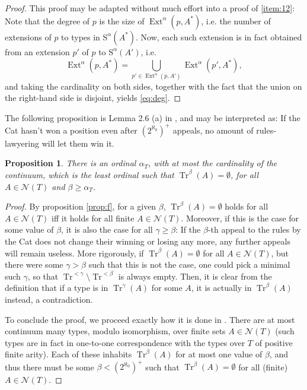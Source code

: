 \documentclass{article}
\newtheorem{prop}[theorem]{Proposition}
\theoremstyle{nonumberplain}
\newtheorem{proof}{Proof}
\newcommand{\calN}{\mathcal{N}}
\newcommand{\Stone}{\mathrm{S}}
\DeclareMathOperator{\Tr}{Tr}
\DeclareMathOperator{\Ext}{Ext}
\begin{document}
\begin{proof}
This proof may be adapted without much effort into a proof of \ref{item:12}: Note that the degree of $p$ is the size of $\Ext^\alpha(p,A^*)$, i.e. the number of extensions of $p$ to types in $\Stone^\alpha(A^*)$. Now, each such extension is in fact obtained from an extension $p'$ of $p$ to $\Stone^\alpha(A')$, i.e.
\begin{equation}
\Ext^\alpha(p,A^*) = \bigcup_{p' \in \Ext^\alpha(p,A')} \Ext^\alpha(p',A^*),
\end{equation}
and taking the cardinality on both sides, together with the fact that the union on the right-hand side is disjoint, yields \eqref{eq:deg}.
\end{proof}

The following proposition is Lemma 2.6 (a) in \cite{morley}, and may be interpreted as: If the Cat hasn't won a position even after $(2^{\aleph_0})^+$ appeals, no amount of rules-lawyering will let them win it.

\begin{prop}
There is an ordinal $\alpha_T$, with at most the cardinality of the continuum, which is the least ordinal such that $\Tr^\beta(A) = \emptyset$, for all $A \in \calN(T)$ and $\beta \geq \alpha_T$.
\end{prop}

\begin{proof}
By proposition \ref{prop:f}, for a given $\beta$, $\Tr^\beta(A) = \emptyset$ holds for all $A \in \calN(T)$ iff it holds for all finite $A \in \calN(T)$. Moreover, if this is the case for some value of $\beta$, it is also the case for all $\gamma \geq \beta$: If the $\beta$-th appeal to the rules by the Cat does not change their winning or losing any more, any further appeals will remain useless. More rigorously, if $\Tr^\beta(A) = \emptyset$ for all $A \in \calN(T)$, but there were some $\gamma > \beta$ such that this is not the case, one could pick a minimal such $\gamma$, so that $\Tr^{<\gamma} \setminus \Tr^{<\beta}$ is always empty. Then, it is clear from the definition that if a type is in $\Tr^\gamma(A)$ for some $A$, it is actually in $\Tr^\beta(A)$ instead, a contradiction.

To conclude the proof, we proceed exactly how it is done in \cite{morley}. There are at most continuum many types, modulo isomorphism, over finite sets $A \in \calN(T)$ (such types are in fact in one-to-one correspondence with the types over $T$ of positive finite arity). Each of these inhabits $\Tr^\beta(A)$ for at most one value of $\beta$, and thus there must be some $\beta < (2^{\aleph_0})^+$ such that $\Tr^\beta(A) = \emptyset$ for all (finite) $A \in \calN(T)$.
\end{proof}
\end{document}
